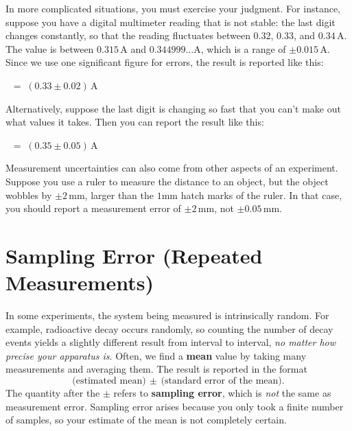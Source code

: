 \documentclass[11pt,a4paper]{article}
\begin{document}
In more complicated situations, you must exercise your judgment.  For
instance, suppose you have a digital multimeter reading that is not
stable: the last digit changes constantly, so that the reading
fluctuates between $0.32$, $0.33$, and $0.34\,\mathrm{A}$.  The value
is between $0.315\,\mathrm{A}$ and $0.344999\dots\mathrm{A}$, which is
a range of $\pm0.015\,\mathrm{A}$.  Since we use one significant
figure for errors, the result is reported like this:
\begin{center}
$\;\;=\; \left(0.33 \pm 0.02\right) \, \mathrm{A}$
\end{center}
Alternatively, suppose the last digit is changing so fast that you
can't make out what values it takes.  Then you can report the result
like this:
\begin{center}
$\;\;=\; \left(0.35 \pm 0.05\right) \, \mathrm{A}$
\end{center}

Measurement uncertainties can also come from other aspects of an
experiment.  Suppose you use a ruler to measure the distance to an
object, but the object wobbles by $\pm 2\,\textrm{mm}$, larger than
the $1\textrm{mm}$ hatch marks of the ruler.  In that case, you should
report a measurement error of $\pm 2\,\textrm{mm}$, not $\pm
0.05\,\textrm{mm}$.

\section{Sampling Error (Repeated Measurements)}

In some experiments, the system being measured is intrinsically
random.  For example, radioactive decay occurs randomly, so counting
the number of decay events yields a slightly different result from
interval to interval, \textit{no matter how precise your apparatus
  is}.  Often, we find a \textbf{mean} value by taking many
measurements and averaging them.  The result is reported in the format
\begin{equation*}
  \textrm{(estimated mean)} \,\pm\, \textrm{(standard error of the mean)}.
\end{equation*}
The quantity after the $\pm$ refers to \textbf{sampling error}, which
is \textit{not} the same as measurement error.  Sampling error arises
because you only took a finite number of samples, so your estimate of
the mean is not completely certain.
\end{document}
